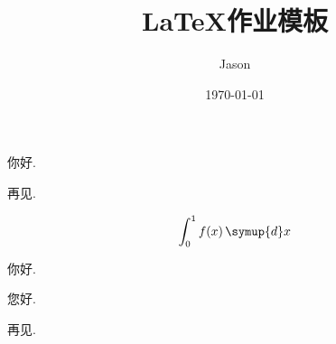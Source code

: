 \documentclass[12pt, chinese, lineno, watermark]{assignment}
\title{\LaTeX 作业模板}
\author{Jason}
\date{\today}
\institute{同济大学数学科学学院}
\newcommand*{\diff}{\mathop{}\!\symup{d}}
\begin{document}
    \maketitle

    你好.

    再见.

    \begin{equation}
        \int_{0}^{1}f(x)\diff x
    \end{equation}

    你好.

    \clearpage

    您好.

    再见.
\end{document}
